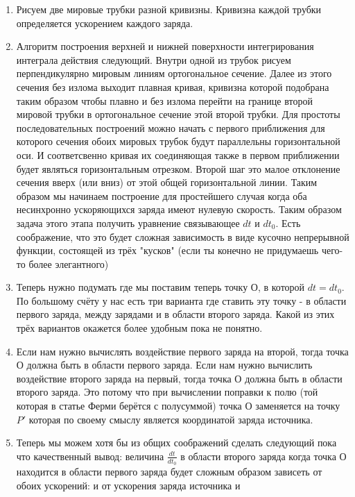 \documentclass[11pt]{article}
\providecommand{\tightlist}{%
      \setlength{\itemsep}{0pt}\setlength{\parskip}{0pt}}
\begin{document}
\begin{enumerate}
\def\labelenumi{\arabic{enumi}.}
\tightlist
\item
  Рисуем две мировые трубки разной кривизны. Кривизна каждой трубки
  определяется ускорением каждого заряда.
\item
  Алгоритм построения верхней и нижней поверхности интегрирования
  интеграла действия следующий. Внутри одной из трубок рисуем
  перпендикулярно мировым линиям ортогональное сечение. Далее из этого
  сечения без излома выходит плавная кривая, кривизна которой подобрана
  таким образом чтобы плавно и без излома перейти на границе второй
  мировой трубки в ортогональное сечение этой второй трубки. Для
  простоты последовательных построений можно начать с первого
  приближения для которого сечения обоих мировых трубок будут
  параллельны горизонтальной оси. И соответсвенно кривая их соединяющая
  также в первом приближении будет являться горизонтальным отрезком.
  Второй шаг это малое отклонение сечения вверх (или вниз) от этой общей
  горизонтальной линии. Таким образом мы начинаем построение для
  простейшего случая когда оба несинхронно ускоряющихся заряда имеют
  нулевую скорость. Таким образом задача этого этапа получить уравнение
  связывающее \(dt\) и \(dt_0\). Есть соображение, что это будет сложная
  зависимость в виде кусочно непрерывной функции, состоящей из трёх
  "кусков" (если ты конечно не придумаешь чего-то более элегантного)
\item
  Теперь нужно подумать где мы поставим теперь точку О, в которой
  \(dt=dt_0\). По большому счёту у нас есть три варианта где ставить эту
  точку - в области первого заряда, между зарядами и в области второго
  заряда. Какой из этих трёх вариантов окажется более удобным пока не
  понятно.
\item
  Если нам нужно вычислять воздействие первого заряда на второй, тогда
  точка О должна быть в области первого заряда. Если нам нужно вычислить
  воздействие второго заряда на первый, тогда точка О должна быть в
  области второго заряда. Это потому что при вычислении поправки к полю
  (той которая в статье Ферми берётся с полусуммой) точка О заменяется
  на точку \(P'\) которая по своему смыслу является координатой заряда
  источника.
\item
  Теперь мы можем хотя бы из общих соображений сделать следующий пока
  что качественный вывод: величина \(\frac{dt}{dt_0}\) в области второго
  заряда когда точка О находится в области первого заряда будет сложным
  образом зависеть от обоих ускорений: и от ускорения заряда источника и

\end{enumerate}
\end{document}
